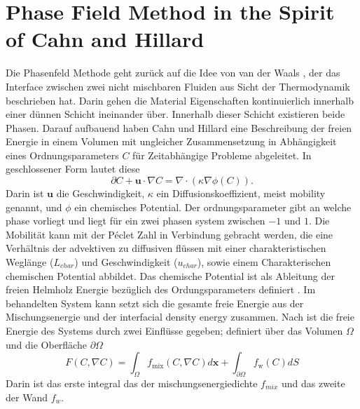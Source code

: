 \section{Phase Field Method in the Spirit of Cahn and Hillard}
Die Phasenfeld Methode geht zurück auf die Idee von van der Waals \cite{vanderwaals1979ThermodynamicTheoryCapillarity}, der das Interface zwischen zwei nicht mischbaren Fluiden aus Sicht der Thermodynamik beschrieben hat. Darin gehen die Material Eigenschaften kontinuierlich innerhalb einer dünnen Schicht ineinander über. Innerhalb dieser Schicht existieren beide Phasen. 
Darauf aufbauend haben Cahn und Hillard \cite{johnw.FreeEnergyNonuniform1958} eine Beschreibung der freien Energie in einem Volumen mit ungleicher Zusammensetzung in Abhängigkeit eines Ordnungsparameters $C$ für Zeitabhängige Probleme abgeleitet. In geschlossener Form lautet diese
\begin{equation}
\label{eq: CahnHillard}
    \partial C + \textbf{u} \cdot \nabla C = \nabla \cdot \left(\kappa \nabla \phi(C)\right).
\end{equation}
Darin ist $\textbf{u}$ die Geschwindigkeit, $\kappa$ ein Diffusionskoeffizient, meist mobility genannt, und $\phi$ ein chemisches Potential. Der ordnungsparameter gibt an welche phase vorliegt und liegt für ein zwei phasen system zwischen $-1$ und $1$. Die Mobilität kann mit der Péclet Zahl in Verbindung gebracht werden, die eine Verhältnis der advektiven zu diffusiven flüssen mit einer charakteristischen Weglänge ($L_{char}$) und Geschwindigkeit ($u_{char}$), sowie einem Charakterischen chemischen Potential abbildet\cite{cai2015NumericalSimulationWetting,holzinger2021DirectNumericalSimulation}. 
Das chemische Potential ist als Ableitung der freien Helmholz Energie bezüglich des Ordungsparameters definiert \cite{johnw.FreeEnergyNonuniform1958}. Im behandelten System kann setzt sich die gesamte freie Energie aus der Mischungsenergie und der interfacial density energy zusammen. Nach \cite{yue2010SharpinterfaceLimitCahn} ist die freie Energie des Systems durch zwei Einflüsse gegeben; definiert über das Volumen $\Omega$ und die Oberfläche $\partial\Omega$ 
\begin{equation}
    F(C, \nabla C) = \int_{\Omega} f_{\mathrm{mix}} (C, \nabla C) d\textbf{x}+ \int_{\partial\Omega}f_\mathrm{w}(C) dS
\end{equation}
Darin ist das erste integral das der mischungsenergiedichte $f_{mix}$ und das zweite der Wand $f_w$.

